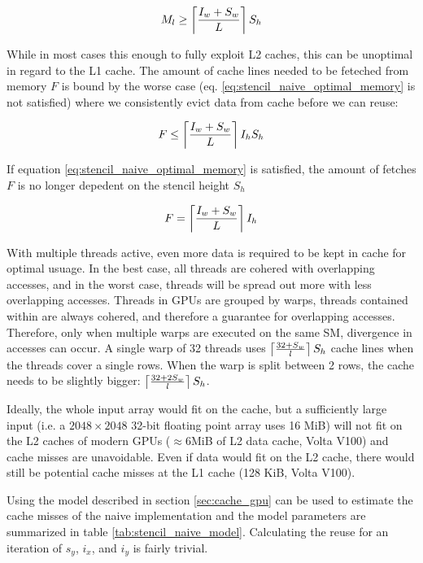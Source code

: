 
\begin{equation}
    M_l \geq \left\lceil \frac{I_w + S_w}{L} \right\rceil S_h \label{eq:stencil_naive_optimal_memory}
\end{equation}

While in most cases  this enough to fully exploit L2 caches, this can be unoptimal in regard to the L1 cache.
The amount of cache lines needed to be feteched from memory $F$ is bound by the worse case (eq. \ref{eq:stencil_naive_optimal_memory} is not satisfied) where we consistently evict data from cache before we can reuse:

\[
    F \leq \left\lceil \frac{I_w + S_w}{L} \right\rceil I_h S_h
\]

If equation \ref{eq:stencil_naive_optimal_memory} is satisfied, the amount of fetches $F$ is no longer depedent on the stencil height $S_h$

\[
    F = \left\lceil \frac{I_w + S_w}{L} \right\rceil I_h
\]

With multiple threads active, even more data is required to be kept in cache for optimal usuage.
In the best case, all threads are cohered with overlapping accesses, and in the worst case, threads will be spread out more with less overlapping accesses.
Threads in GPUs are grouped by warps, threads contained within are always cohered, and therefore a guarantee for overlapping accesses.
Therefore, only when multiple warps are executed on the same SM, divergence in accesses can occur.
A single warp of 32 threads uses $\left\lceil \frac{32 + S_w}{l} \right\rceil S_h$ cache lines when the threads cover a single rows. 
When the warp is split between 2 rows, the cache needs to be slightly bigger: $\left\lceil \frac{32 + 2 S_w}{l} \right\rceil S_h$.

Ideally, the whole input array would fit on the cache, but a sufficiently large input (i.e. a $2048\times2048$ 32-bit floating point array uses 16 MiB) will not fit on the L2 caches of modern GPUs ($\approx6$MiB of L2 data cache, Volta V100) and cache misses are unavoidable.
Even if data would fit on the L2 cache, there would still be potential cache misses at the L1 cache (128 KiB, Volta V100).


\vspace{2cm}

Using the model described in section \ref{sec:cache_gpu} can be used to estimate the cache misses of the naive implementation and the model parameters are summarized in table \ref{tab:stencil_naive_model}.
Calculating the reuse for an iteration of $s_y$, $i_x$, and $i_y$ is fairly trivial.

